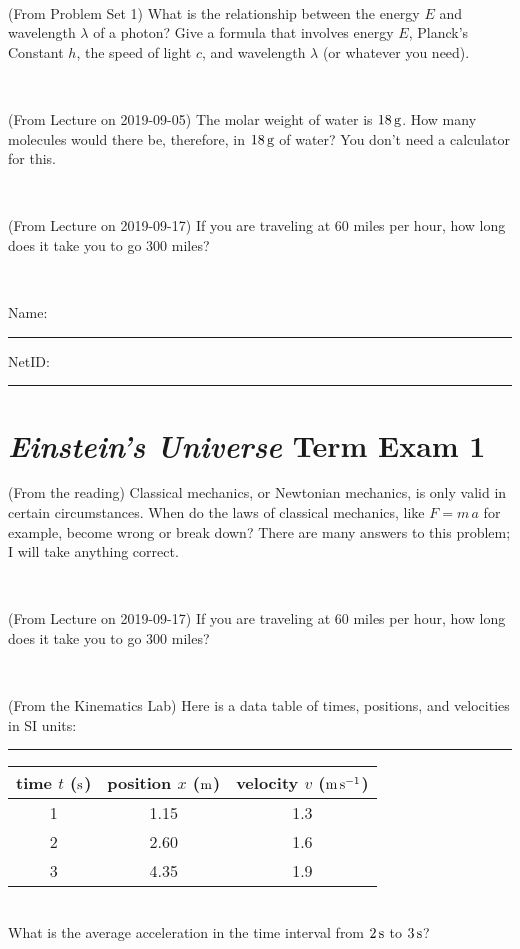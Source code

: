 \documentclass[12pt, letterpaper]{article}
\begin{document}
\vfill ~

\begin{problem} (From Problem Set 1)
What is the relationship between the energy $E$ and wavelength
$\lambda$ of a photon? Give a formula that involves energy $E$,
Planck's Constant $h$, the speed of light $c$, and wavelength
$\lambda$ (or whatever you need).
\end{problem}

\vfill ~

\begin{problem} (From Lecture on 2019-09-05)
The molar weight of water is $18\,\mathrm{g}$. How many molecules would there
be, therefore, in $18\,\mathrm{g}$ of water? You don't need a calculator for
this.
\end{problem}


\vfill ~

\begin{problem} (From Lecture on 2019-09-17)
If you are traveling at 60 miles per hour, how long does
it take you to go 300 miles?
\end{problem}


\vfill ~


\cleardoublepage



\noindent
Name: \rule[-1ex]{0.60\textwidth}{0.1pt}
NetID: \rule[-1ex]{0.20\textwidth}{0.1pt}

\section*{\textsl{Einstein's Universe} Term Exam 1}
\setcounter{problem}{1}


\begin{problem} (From the reading)
Classical mechanics, or Newtonian mechanics, is only valid in certain
circumstances. When do the laws of classical mechanics, like $F =
m\,a$ for example, become wrong or break down? There are many answers
to this problem; I will take anything correct.
\end{problem}


\vfill ~

\begin{problem} (From Lecture on 2019-09-17)
If you are traveling at 60 miles per hour, how long does
it take you to go 300 miles?
\end{problem}


\vfill ~

\begin{problem} (From the Kinematics Lab)
Here is a data table of times, positions, and velocities in SI units:\\
\rule{1.0in}{0pt}\begin{tabular}{c|c|c}
time $t$ ($\mathrm{s}$) & position $x$ ($\mathrm{m}$) & velocity $v$ ($\mathrm{m}\,\mathrm{s}^{-1}$) \\
\hline
1 & 1.15 & 1.3 \\
2 & 2.60 & 1.6 \\
3 & 4.35 & 1.9 \\
\hline
\end{tabular}\\
What is the average acceleration in the time interval from $2\,\mathrm{s}$ to $3\,\mathrm{s}$?
\end{problem}
\end{document}
